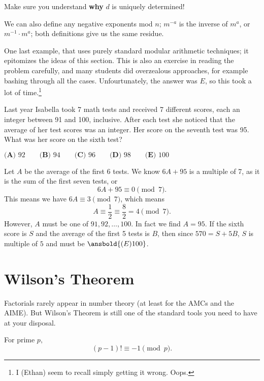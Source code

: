 \documentclass[mast]{lucky}
\begin{document}
Make sure you understand \textbf{why} $d$ is uniquely determined!

\begin{fact}
We can also define any negative exponents mod $n$; $m^{-a}$ is the inverse of $m^a$, or $m^{-1}\cdot m^a$; both definitions give us the same residue.
\end{fact}

One last example, that uses purely standard modular arithmetic techniques; it epitomizes the ideas of this section. This is also an exercise in reading the problem carefully, and many students did overzealous approaches, for example bashing through all the cases. Unfourtunately, the answer was $E$, so this took a lot of time.\footnote{I (Ethan) seem to recall simply getting it wrong. Oops.}

\begin{exam}[AMC 10B 2017/25]
Last year Isabella took 7 math tests and received 7 different scores, each an integer between 91 and 100, inclusive. After each test she noticed that the average of her test scores was an integer. Her score on the seventh test was 95. What was her score on the sixth test?

$\textbf{(A)} \text{ 92} \qquad \textbf{(B)} \text{ 94} \qquad \textbf{(C)} \text{ 96} \qquad \textbf{(D)} \text{ 98} \qquad \textbf{(E)} \text{ 100}$
\end{exam}

\begin{sol}
Let $A$ be the average of the first 6 tests. We know $6A + 95$ is a multiple of 7, as it is the sum of the first seven tests, or \[6A + 95 \equiv 0 \pmod{7}\text{.}\] This means we have $6A  \equiv 3 \pmod 7$, which means \[A \equiv \frac12 \equiv \frac82 = 4 \pmod{7}\text{.}\] However, $A$ must be one of ${91,92,\dots, 100}$. In fact we find $A = 95$. If the sixth score is $S$ and the average of the first 5 tests is $B$, then since $570 = S + 5B$, $S$ is multiple of $5$ and must be $\ansbold{(E) 100}$.
\end{sol}

\section{Wilson's Theorem}

Factorials rarely appear in number theory (at least for the AMCs and the AIME). But Wilson's Theorem is still one of the standard tools you need to have at your disposal.

\begin{theo}
For prime $p,$ $$(p-1)!\equiv -1\pmod{p}.$$
\end{theo}
\end{document}
